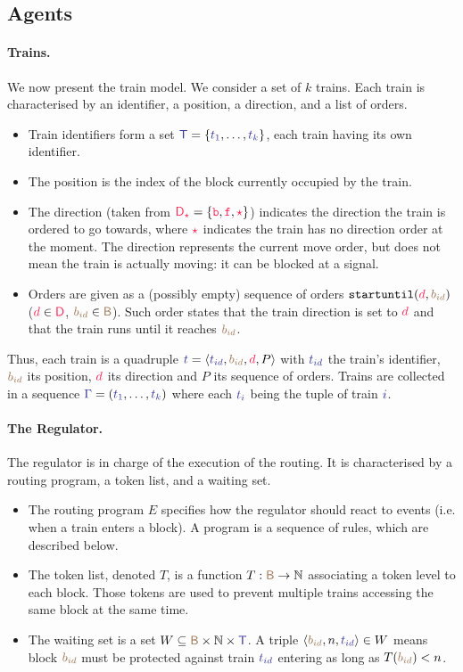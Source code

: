 \documentclass[runningheads]{llncs}
\newcommand{\Nat}{{\mbox{$\mathbb{N}$}}}
\newcommand{\tuple}[1]{\ensuremath{\langle #1\rangle}}
\newcommand{\directions}{\dirFmt{\mathsf{D}}}
\newcommand{\forward}{\ensuremath{\mathtt{f}}}
\newcommand{\backward}{\ensuremath{\mathtt{b}}\xspace}
\newcommand{\dirFmt}[1]{{\color{dircolor} #1}}
\newcommand{\dirForward}{\ensuremath{\dirFmt{\forward}}\xspace}
\newcommand{\dirBackward}{\ensuremath{\dirFmt{\backward}}\xspace}
\newcommand{\dirStop}{\ensuremath{\dirFmt{\star}}\xspace}
\newcommand{\posFmt}[1]{{\color{poscolor}{#1}}}
\newcommand{\blocks}{{\posFmt{\mathsf{B}}}}
\newcommand{\bid}[1]{\ensuremath{\posFmt{b_{#1}}}}
\newcommand{\trainFmt}[1]{{\color{traincolor} #1}}
\newcommand{\trainTuple}[4]{\langle \trainFmt{#1}, \posFmt{#2}, \dirFmt{#3}, #4 \rangle}
\newcommand{\trainSeq}{\trainFmt{\Gamma\xspace}}
\newcommand{\trains}{{\trainFmt{\mathsf{T}}}}
\newcommand{\tid}[1]{\ensuremath{\trainFmt{t_{#1}}}}
\newcommand{\su}[2]{{\mbox{$\mathtt{startuntil}(\dirFmt{#1}, \posFmt{#2})$}}\xspace}
\newcommand{\tokens}{\ensuremath{T}}
\newcommand{\tokenOf}[1]{\ensuremath{T(\posFmt{#1})}}
\begin{document}
\subsection{Agents}
\paragraph{Trains.}
We now present the train model. We consider a set of $k$ trains. 
Each train is characterised by an identifier, a position, a direction, and a list of orders.
\begin{itemize}
	\item Train identifiers form a set  $\trains = \{\tid{1}, \ldots, \tid{k}\}$, each train having its own identifier.
	\item The position is the index of the block currently occupied by the train.
	\item The direction (taken from $\directions_\dirStop = \{\dirBackward, \dirForward, \dirStop\}$) indicates the direction the train is ordered to go towards, where \dirStop indicates the train has no direction order at the moment. The direction represents the current move order, but does not mean the train is actually moving: it can be blocked at a signal.
	\item Orders are given as a (possibly empty) sequence of orders $\su{d}{\bid{id}}$ ($\dirFmt{d} \in \directions$, $\bid{id} \in \blocks$). Such order states that the train direction is set to $\dirFmt{d}$ and that the train runs until it reaches $\bid{id}$.
\end{itemize}

Thus, each train is a quadruple $\trainFmt{t} = \trainTuple{\tid{id}}{\bid{id}}{d}{P}$ with $\tid{id}$ the train's identifier, $\bid{id}$ its position, $\dirFmt{d}$ its direction and $P$ its sequence of orders. Trains are collected in a sequence $\trainSeq = (\trainFmt{t_1}, \ldots, \trainFmt{t_k})$ where each $\trainFmt{t_i}$ being the tuple of train $\trainFmt{i}$. 


\paragraph{The Regulator.}
The regulator is in charge of the execution of the routing.
It is characterised by a routing program, a token list, and a waiting set.

\begin{itemize}
	\item The routing program $E$ specifies how the regulator should react to events (i.e. when a train enters a block). A program is a sequence of rules, which are described below.
	\item The token list, denoted $\tokens$, is a function  $\tokens: \blocks \to \Nat$ associating a token level to each block. Those tokens are used to prevent multiple trains accessing the same block at the same time.
	\item The waiting set is a set $W \subseteq \blocks \times \Nat \times \trains$. A triple $\tuple{\bid{id}, n, \tid{id}} \in W$ means block $\bid{id}$ must be protected against train $\tid{id}$ entering as long as $\tokenOf{\bid{id}} < n$.
\end{itemize}
\end{document}
